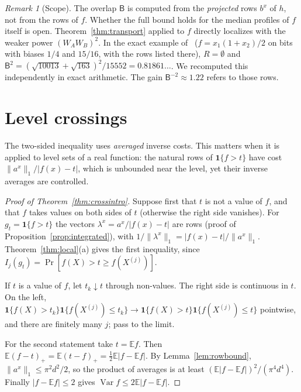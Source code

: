 \documentclass[11pt]{article}
\numberwithin{equation}{section}
\theoremstyle{definition}
\theoremstyle{remark}
\newtheorem{remark}[theorem]{Remark}
\newcommand{\E}{\mathbb{E}}
\newcommand{\1}{\mathbf 1}
\newcommand{\Var}{\operatorname{Var}}
\newcommand{\nrm}[1]{\lVert #1\rVert_1}
\begin{document}
\begin{remark}[Scope]
The overlap $\mathsf B$ is computed from the \emph{projected} rows $b^x$ of $h$, not from the rows of $f$. Whether the full bound holds for the median profiles of $f$ itself is open. Theorem~\ref{thm:transport} applied to $f$ directly localizes with the weaker power $(W_AW_B)^2$. In the exact example of~\cite{WriWIL} ($f=x_1(1+x_2)/2$ on bits with biases $1/4$ and $15/16$, with the rows listed there), $R=\emptyset$ and $\mathsf B^2=(\sqrt{10013}+\sqrt{163})^2/15552=0.81861\ldots$. We recomputed this independently in exact arithmetic. The gain $\mathsf B^{-2}\approx1.22$ refers to those rows.
\end{remark}

\section{Level crossings}\label{sec:crossing}

The two-sided inequality uses \emph{averaged} inverse costs. This matters when it is applied to level sets of a real function: the natural rows of $\1\{f>t\}$ have cost $\nrm{a^x}/|f(x)-t|$, which is unbounded near the level, yet their inverse averages are controlled.

\begin{proof}[Proof of Theorem~\ref{thm:crossintro}]
Suppose first that $t$ is not a value of $f$, and that $f$ takes values on both sides of $t$ (otherwise the right side vanishes). For $g_t=\1\{f>t\}$ the vectors $\lambda^x=a^x/|f(x)-t|$ are rows (proof of Proposition~\ref{prop:integrated}), with $1/\nrm{\lambda^x}=|f(x)-t|/\nrm{a^x}$. Theorem~\ref{thm:local}(a) gives the first inequality, since $I_j(g_t)=\Pr[f(X)>t\ge f(X^{(j)})]$.

If $t$ is a value of $f$, let $t_k\downarrow t$ through non-values. The right side is continuous in $t$. On the left, $\1\{f(X)>t_k\}\1\{f(X^{(j)})\le t_k\}\to\1\{f(X)>t\}\1\{f(X^{(j)})\le t\}$ pointwise, and there are finitely many $j$; pass to the limit.

For the second statement take $t=\E f$. Then $\E(f-t)_+=\E(t-f)_+=\frac12\E|f-\E f|$. By Lemma~\ref{lem:rowbound}, $\nrm{a^x}\le\pi^2d^2/2$, so the product of averages is at least $(\E|f-\E f|)^2/(\pi^4d^4)$. Finally $|f-\E f|\le2$ gives $\Var f\le2\E|f-\E f|$.
\end{proof}
\end{document}
